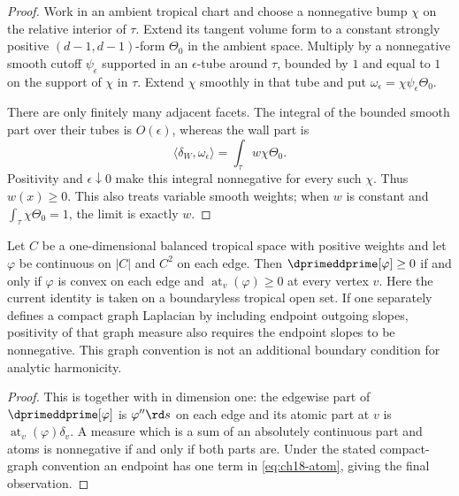\begin{proof}
Work in an ambient tropical chart and choose a nonnegative bump $\chi$
on the relative interior of $\tau$.  Extend its tangent volume form to a
constant strongly positive $(d-1,d-1)$-form $\Theta_0$ in the ambient
space.  Multiply by a nonnegative smooth cutoff $\psi_\epsilon$ supported
in an $\epsilon$-tube around $\tau$, bounded by $1$ and equal to $1$ on
the support of $\chi$ in $\tau$.  Extend $\chi$ smoothly in that tube and
put $\omega_\epsilon=\chi\psi_\epsilon\Theta_0$.

There are only finitely many adjacent facets.  The integral of the bounded
smooth part over their tubes is $O(\epsilon)$, whereas the wall part is
\[
 \langle\delta_W,\omega_\epsilon\rangle
       =\int_\tau w\chi\Theta_0.
\]
Positivity and $\epsilon\downarrow0$ make this integral nonnegative for
every such $\chi$.  Thus $w(x)\geq0$.  This also treats variable smooth
weights; when $w$ is constant and $\int_\tau\chi\Theta_0=1$, the limit is
exactly $w$.
\end{proof}

\begin{corollary}
\label{cor:ch18-positivity-onedim}
Let $C$ be a one-dimensional balanced tropical space with positive weights
and let $\varphi$ be continuous on $|C|$ and $C^2$ on each edge.  Then
$\dprimeddprime[\varphi]\geq0$ if and only if $\varphi$ is convex on each
edge and $\operatorname{at}_v(\varphi)\geq0$ at every vertex $v$.
Here the current identity is taken on a boundaryless tropical open set.
If one separately defines a compact graph Laplacian by including endpoint
outgoing slopes, positivity of that graph measure also requires the
endpoint slopes to be nonnegative.  This graph convention is not an
additional boundary condition for analytic harmonicity.
\end{corollary}

\begin{proof}
This is  together with
 in dimension one: the edgewise part of
$\dprimeddprime[\varphi]$ is $\varphi''\rd s$ on each edge and its atomic
part at $v$ is $\operatorname{at}_v(\varphi)\delta_v$.  A measure which is
a sum of an absolutely continuous part and atoms is nonnegative if and only
if both parts are.  Under the stated compact-graph convention an endpoint
has one term in \eqref{eq:ch18-atom}, giving the final observation.
\end{proof}

